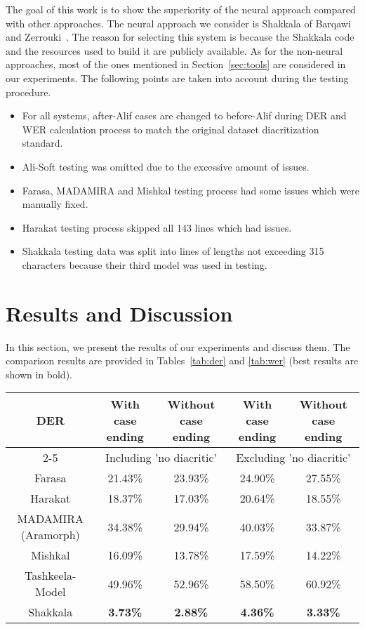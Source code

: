 \documentclass[conference]{IEEEtran}
\begin{document}
The goal of this work is to show the superiority of the neural approach compared with other approaches. The neural approach we consider is Shakkala of Barqawi and Zerrouki~\cite{shakkala}. The reason for selecting this system is because the Shakkala code and the resources used to build it are publicly available.
As for the non-neural approaches, most of the ones mentioned in Section~\ref{sec:tools} are considered in our experiments. The following points are taken into account during the testing procedure.
\begin{itemize}
\item For all systems, after-Alif cases are changed to before-Alif during DER and WER calculation process to match the original dataset diacritization standard.

\item Ali-Soft testing was omitted due to the excessive amount of issues.

\item Farasa, MADAMIRA and Mishkal testing process had some issues which were manually fixed.

\item Harakat testing process skipped all 143 lines which had issues.

\item Shakkala testing data was split into lines of lengths not exceeding 315 characters because their third model was used in testing.
\end{itemize}

\section{Results and Discussion}
\label{sec:res}

In this section, we present the results of our experiments and discuss them.
The comparison results are provided in Tables~\ref{tab:der} and \ref{tab:wer} (best results are shown in bold).

\begin{table*}
\centering
\caption{DER results}
\label{tab:der}
\begin{tabular}{|c|c|c|c|c|}
\hline
\multirow{2}{*}{DER} & With case ending & Without case ending & With case ending & Without case ending \\ \cline{2-5} 
 & \multicolumn{2}{c|}{Including 'no diacritic'} & \multicolumn{2}{c|}{Excluding 'no diacritic'} \\ \hline
Farasa & 21.43\% & 23.93\% & 24.90\% & 27.55\% \\ \hline
Harakat & 18.37\% & 17.03\% & 20.64\% & 18.55\% \\ \hline
MADAMIRA (Aramorph) & 34.38\% & 29.94\% & 40.03\% & 33.87\% \\ \hline
Mishkal & 16.09\% & 13.78\% & 17.59\% & 14.22\% \\ \hline
Tashkeela-Model & 49.96\% & 52.96\% & 58.50\% & 60.92\% \\ \hline
Shakkala & \textbf{3.73\%} & \textbf{2.88\%} & \textbf{4.36\%} & \textbf{3.33\%} \\ \hline
\end{tabular}
\end{table*}
\end{document}
